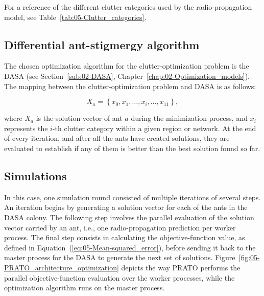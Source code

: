 For a reference of the different clutter categories used by the radio-propagation
model, see Table~\ref{tab:05-Clutter_categories}.


\subsection{Differential ant-stigmergy algorithm}

The chosen optimization algorithm for the clutter-optimization problem
is the DASA (see Section~\ref{sub:02-DASA}, Chapter~\ref{chap:02-Optimization_models}).
The mapping between the clutter-optimization problem and DASA is as
follows:

\begin{equation}
X_{a}=\left\{ x_{0},x_{1},\ldots,x_{i},\ldots,x_{11}\right\} ,\label{eq:DASA-problem_mapping}
\end{equation}


\noindent where $X_{a}$ is the solution vector of ant $a$ during
the minimization process, and $x_{i}$ represents the $i$-th clutter
category within a given region or network. At the end of every iteration,
and after all the ants have created solutions, they are evaluated
to establish if any of them is better than the best solution found
so far.


\subsection{Simulations}

In this case, one simulation round consisted of multiple iterations
of several steps. An iteration begins by generating a solution vector
for each of the ants in the DASA colony. The following step involves
the parallel evaluation of the solution vector carried by an ant,
i.e., one radio-propagation prediction per worker process. The final
step consists in calculating the objective-function value, as defined
in Equation~(\ref{eq:05-Mean-squared_error}), before sending it
back to the master process for the DASA to generate the next set of
solutions. Figure~\ref{fig:05-PRATO_architecture_optimization} depicts
the way PRATO performs the parallel objective-function evaluation
over the worker processes, while the optimization algorithm runs on
the master process.

